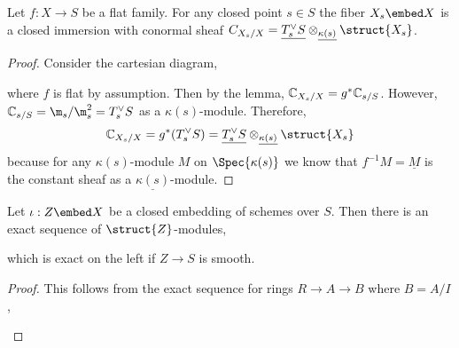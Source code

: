 \documentclass[12pt]{article}
\begin{document}
\begin{cor}
Let $f : X \to S$ be a flat family. For any closed point $s \in S$ the fiber $X_s \embed X$ is a closed immersion with conormal sheaf $C_{X_s/X} = \underline{T_s^\vee S} \otimes_{\underline{\kappa(s)}} \struct{X_s}$.
\end{cor}

\begin{proof}
Consider the cartesian diagram,
\begin{center}
\end{center}
where $f$ is flat by assumption. Then by the lemma, $\mathbb{C}_{X_s/X} = g^* \mathbb{C}_{s/S}$. However, $\C_{s/S} = \m_s / \m_s^2 = T_s^\vee S$ as a $\kappa(s)$-module. Therefore, 
\[ \C_{X_s / X} = g^* (T_s^\vee S) = \underline{T_s^\vee S} \otimes_{\underline{\kappa(s)}} \struct{X_s} \]
because for any $\kappa(s)$-module $M$ on $\Spec{\kappa(s)}$ we know that $f^{-1} M = \underline{M}$ is the constant sheaf as a $\underline{\kappa(s)}$-module. 
\end{proof}

\begin{lemma}
Let $\iota : Z \embed X$ be a closed embedding of schemes over $S$. Then there is an exact sequence of $\struct{Z}$-modules,
\begin{center}
\end{center}
which is exact on the left if $Z \to S$ is smooth.
\end{lemma}

\begin{proof}
This follows from the exact sequence for rings $R \to A \to B$ where $B = A / I$,
\begin{center}
\end{center}
\end{proof}

\renewcommand{\X}{\mathfrak{X}}
\end{document}
